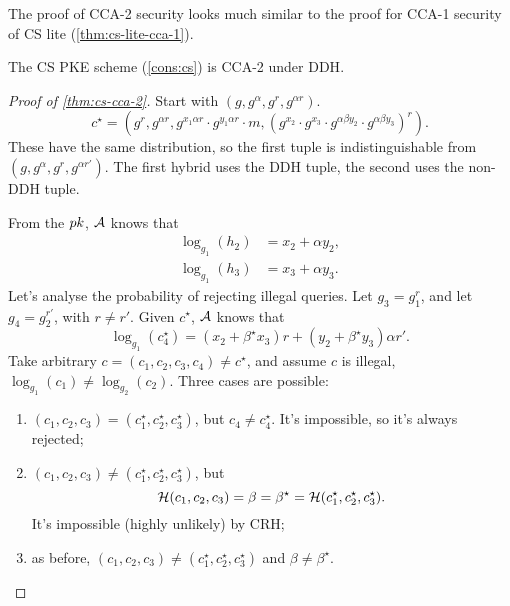 The proof of \ac{CCA}-2 security looks much similar to the proof for \ac{CCA}-1 security of \ac{CS} lite (\cref{thm:cs-lite-cca-1}).

\begin{theorem} \label{thm:cs-cca-2}
	The \ac{CS} \ac{PKE} scheme (\cref{cons:cs}) is \ac{CCA}-2 under \ac{DDH}.
\end{theorem}

\begin{proof}[Proof of \cref{thm:cs-cca-2}]
	Start with $(g, g^{\alpha}, g^r, g^{\alpha r})$.
	\begin{equation*}
		c^{\star} = \left( g^r, g^{\alpha r}, g^{x_1 \alpha r} \cdot g^{y_1 \alpha r} \cdot m, \left(g^{x_2} \cdot g^{x_3} \cdot g^{\alpha \beta y_2} \cdot g^{\alpha \beta y_3}\right)^{r} \right).
	\end{equation*}
	These have the same distribution, so the first tuple is indistinguishable from $(g, g^{\alpha}, g^{r}, g^{\alpha r'})$.
	The first hybrid uses the \ac{DDH} tuple, the second uses the non-\ac{DDH} tuple.

	From the $pk$, $\mathcal{A}$ knows that
	\begin{align*}
		\log_{g_1} (h_2) & = x_2 + \alpha y_2, \\
		\log_{g_1} (h_3) & = x_3 + \alpha y_3.
	\end{align*}
	Let's analyse the probability of rejecting illegal queries.
	Let $g_3 = g_1^{r}$, and let $g_4 = g_2^{r'}$, with $r \neq r'$.
	Given $c^{\star}$, $\mathcal{A}$ knows that
	\begin{equation*}
		\log_{g_1} (c_4^{\star}) =
		(x_2 + \beta^{\star} x_3) r + (y_2 + \beta^{\star} y_3) \alpha r'.
	\end{equation*}
	Take arbitrary $c = (c_1, c_2, c_3, c_4) \neq c^{\star}$, and assume $c$ is illegal, \ie $\log_{g_1}(c_1) \neq \log_{g_2}(c_2)$.
	Three cases are possible:
	\begin{enumerate}
		\item $(c_1, c_2, c_3) = (c_1^{\star}, c_2^{\star}, c_3^{\star})$, but $c_4 \neq c_4^{\star}$.
			It's impossible, so it's always rejected;
		\item $(c_1, c_2, c_3) \neq (c_1^{\star}, c_2^{\star}, c_3^{\star})$, but
			\begin{equation*}
				\mathcal{H}(c_1, c_2, c_3) = \beta = \beta^{\star} = \mathcal{H}(c_1^{\star}, c_2^{\star}, c_3^{\star}).
			\end{equation*}
			It's impossible (highly unlikely) by \ac{CRH};
		\item as before, $(c_1, c_2, c_3) \neq (c_1^{\star}, c_2^{\star}, c_3^{\star})$ and $\beta \neq \beta^{\star}$. \qedhere
	\end{enumerate}
\end{proof}
